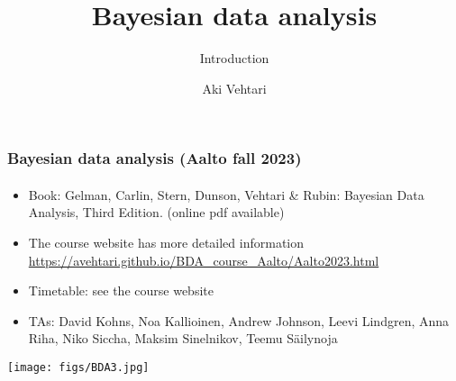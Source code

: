 \documentclass[english,t]{beamer}
\date{}
\title[]{Bayesian data analysis}
\subtitle{Introduction}
\author{Aki Vehtari}
\institute[Aalto University]{}
\begin{document}
\begin{frame}
  \frametitle{Bayesian data analysis (Aalto fall 2023)}  %
  \framesubtitle{}
  
  \begin{itemize}
  \item Book: Gelman, Carlin, Stern, Dunson, Vehtari \& Rubin: Bayesian Data
    Analysis, Third Edition. {\footnotesize (online pdf available)}
  \item The course website has more detailed information\\
    {\small\url{https://avehtari.github.io/BDA_course_Aalto/Aalto2023.html}}
  \item Timetable: see the course website
  \item TAs: David Kohns, Noa Kallioinen, Andrew Johnson, Leevi
    Lindgren, Anna Riha, Niko Siccha, Maksim Sinelnikov, Teemu
    Säilynoja
    \end{itemize}
    \vspace{-0.25\baselineskip}
 \begin{center}
   \texttt{[image: figs/BDA3.jpg]}
 \end{center}

\end{frame}
\end{document}
